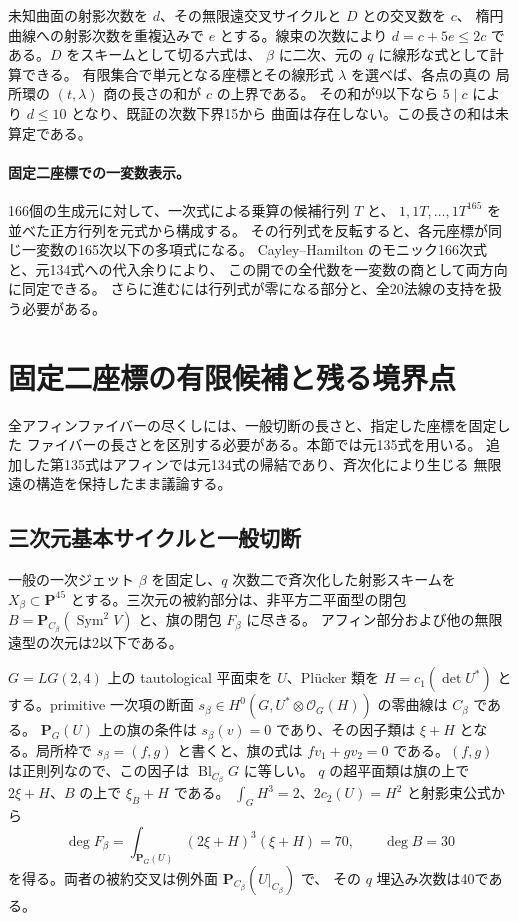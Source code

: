 \documentclass[11pt,a4paper]{ltjsarticle}
\newcommand{\PP}{\mathbf P}
\theoremstyle{remark}
\begin{document}
未知曲面の射影次数を $d$、その無限遠交叉サイクルと $D$ との交叉数を $c$、
楕円曲線への射影次数を重複込みで $e$ とする。線束の次数により
$d=c+5e\le2c$ である。$D$ をスキームとして切る六式は、
$\beta$ に二次、元の $q$ に線形な式として計算できる。
有限集合で単元となる座標とその線形式 $\lambda$ を選べば、各点の真の
局所環の $(t,\lambda)$ 商の長さの和が $c$ の上界である。
その和が9以下なら $5\mid c$ により $d\le10$ となり、既証の次数下界15から
曲面は存在しない\cite{anchor-length-v59}。この長さの和は未算定である。

\paragraph{固定二座標での一変数表示。}
166個の生成元に対して、一次式による乗算の候補行列 $T$ と、
$1,1T,\ldots,1T^{165}$ を並べた正方行列を元式から構成する。
その行列式を反転すると、各元座標が同じ一変数の165次以下の多項式になる。
Cayley--Hamilton のモニック166次式と、元134式への代入余りにより、
この開での全代数を一変数の商として両方向に同定できる\cite{pair-uni-v59}。
さらに進むには行列式が零になる部分と、全20法線の支持を扱う必要がある。

\section{固定二座標の有限候補と残る境界点}
\label{sec:finite-pair-candidates}
全アフィンファイバーの尽くしには、一般切断の長さと、指定した座標を固定した
ファイバーの長さとを区別する必要がある。本節では元135式を用いる。
追加した第135式はアフィンでは元134式の帰結であり、斉次化により生じる
無限遠の構造を保持したまま議論する。

\subsection{三次元基本サイクルと一般切断}
一般の一次ジェット $\beta$ を固定し、$q$ 次数二で斉次化した射影スキームを
$X_\beta\subset\PP^{45}$ とする。三次元の被約部分は、非平方二平面型の閉包
$B=\PP_{C_\beta}(\operatorname{Sym}^2 V)$ と、旗の閉包 $F_\beta$ に尽きる。
アフィン部分および他の無限遠型の次元は2以下である。

$G=LG(2,4)$ 上の tautological 平面束を $U$、Pl\"ucker 類を
$H=c_1(\det U^*)$ とする。primitive 一次項の断面
$s_\beta\in H^0(G,U^*\otimes\mathcal O_G(H))$ の零曲線は $C_\beta$ である。
$\PP_G(U)$ 上の旗の条件は $s_\beta(v)=0$ であり、その因子類は
$\xi+H$ となる。局所枠で $s_\beta=(f,g)$ と書くと、旗の式は
$f v_1+g v_2=0$ である。$(f,g)$ は正則列なので、この因子は
$\operatorname{Bl}_{C_\beta}G$ に等しい。
$q$ の超平面類は旗の上で $2\xi+H$、$B$ の上で $\xi_B+H$ である。
$\int_G H^3=2$、$2c_2(U)=H^2$ と射影束公式から
\[
 \deg F_\beta=\int_{\PP_G(U)}(2\xi+H)^3(\xi+H)=70,
 \qquad \deg B=30
\]
を得る。両者の被約交叉は例外面 $\PP_{C_\beta}(U|_{C_\beta})$ で、
その $q$ 埋込み次数は40である。
\end{document}
